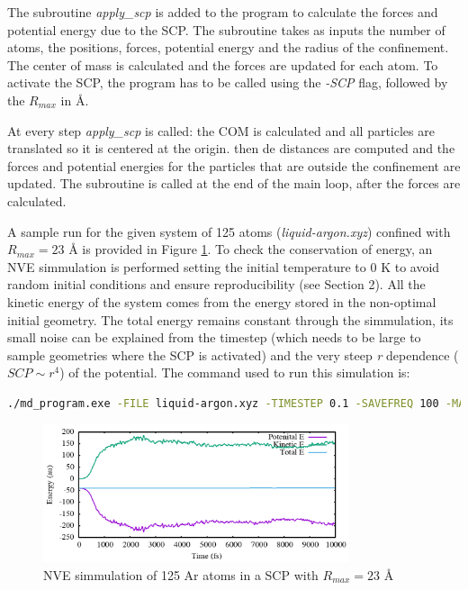 \documentclass{cis320}
\begin{document}
The subroutine \textit{apply\_scp} is added to the program to calculate the forces and potential energy due to the SCP. The subroutine takes as inputs the number of atoms, the positions, forces, potential energy and the radius of the confinement. The center of mass is calculated and the forces are updated for each atom. To activate the SCP, the program has to be called using the \textit{-SCP} flag, followed by the $R_{max}$ in \r{A}.\\
\par
At every step \textit{apply\_scp} is called: the COM is calculated and all particles are translated so it is centered at the origin. then de distances are computed and the forces and potential energies for the particles that are outside the confinement are updated. The subroutine is called at the end of the main loop, after the forces are calculated.\\
\par
A sample run for the given system of 125 atoms (\textit{liquid-argon.xyz}) confined with $R_{max}=23$ \r{A} is  provided in Figure \ref{fig:SCP}. To check the conservation of energy, an NVE simmulation is performed setting the initial temperature to 0 K to avoid random initial conditions and ensure reproducibility (see Section 2). All the kinetic energy of the system comes from the energy stored in the non-optimal initial geometry. The total energy remains constant through the simmulation, its small noise can be explained from the timestep (which needs to be large to sample geometries where the SCP is activated) and the very steep \textit{r} dependence ($SCP \sim r^4$) of the potential. The command used to run this simulation is:

\begin{lstlisting}[language=bash]
  ./md_program.exe -FILE liquid-argon.xyz -TIMESTEP 0.1 -SAVEFREQ 100 -MAX_MD_STEPS 100000 -TEMP 0 -SCP 23\end{lstlisting}

\begin{figure}[th!]
    \centering
    \includegraphics[width=0.8\textwidth]{SCP.png}
    \caption{NVE simmulation of 125 Ar atoms in a SCP with $R_{max}=23$ \r{A}}
    \label{fig:SCP}
\end{figure}
\end{document}
